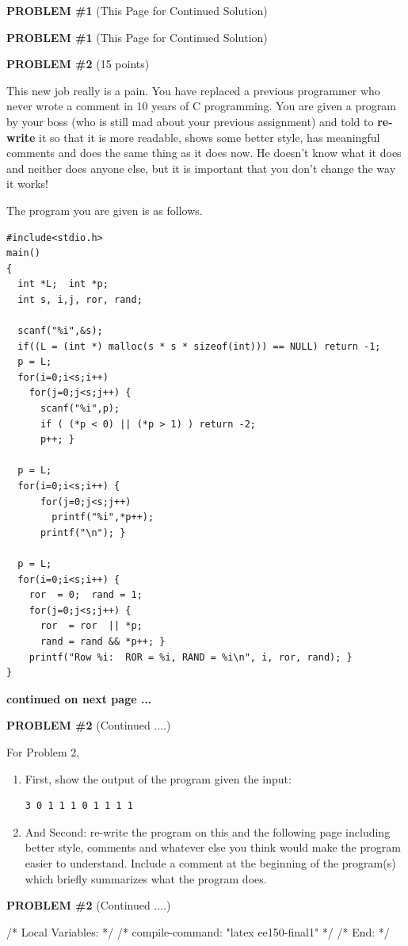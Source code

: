 \pagebreak
{\bf PROBLEM \#1} (This Page for Continued Solution)


\pagebreak
{\bf PROBLEM \#1} (This Page for Continued Solution)
 

\pagebreak
{\bf PROBLEM \#2} (15 points)

This new job really is a pain.  You have replaced a previous programmer
who never wrote a comment in 10 years of C programming.   You are
given a program by your boss (who is still mad about your previous
assignment) and told to {\bf re-write} it so that it is more readable, shows
some better style, has meaningful comments and does the same thing as
it does now.  He doesn't know what it does and neither does anyone
else, but it is important that you don't change the way it works!

The program you are given is as follows.
\begin{verbatim}
#include<stdio.h>
main()
{
  int *L;  int *p;
  int s, i,j, ror, rand; 

  scanf("%i",&s);
  if((L = (int *) malloc(s * s * sizeof(int))) == NULL) return -1;
  p = L;
  for(i=0;i<s;i++) 
    for(j=0;j<s;j++) {
      scanf("%i",p);
      if ( (*p < 0) || (*p > 1) ) return -2;
      p++; }
  
  p = L;
  for(i=0;i<s;i++) {
      for(j=0;j<s;j++) 
        printf("%i",*p++);
      printf("\n"); }

  p = L;
  for(i=0;i<s;i++) {
    ror  = 0;  rand = 1;
    for(j=0;j<s;j++) {
      ror  = ror  || *p;
      rand = rand && *p++; }
    printf("Row %i:  ROR = %i, RAND = %i\n", i, ror, rand); }
}
\end{verbatim}

{\bf continued on next page ...}

\pagebreak
{\bf PROBLEM \#2} (Continued ....)

For Problem 2, 
\begin{enumerate}
\item First, show the output of the program given the input:
\begin{verbatim}
3 0 1 1 1 0 1 1 1 1 
\end{verbatim}
\item And Second: re-write the program on this and the following page
including better style, comments and whatever else you think would
make the program easier to understand.  Include a comment at the beginning of
the program(s) which briefly summarizes what the program does.

\end{enumerate}

\pagebreak
{\bf PROBLEM \#2} (Continued ....)



/* Local Variables: */
/* compile-command: "latex ee150-final1" */
/* End: */